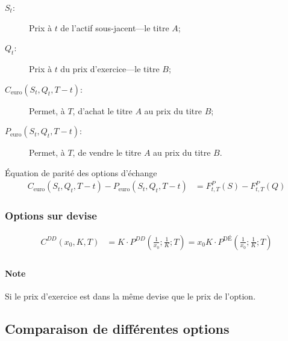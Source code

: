 \documentclass[10pt, french]{article}
\begin{document}
\begin{multicols*}{2}
\begin{rappel_enhanced}
\begin{description}
	\item[$S_{t}$:] Prix à $t$ de l'actif sous-jacent---le titre $A$;
	\item[$Q_{t}$:] Prix à $t$ du prix d'exercice---le titre $B$;
	\item[$C_{\text{euro}}(S_{t}, Q_{t}, T - t)$:] Permet, à $T$, d'achat le titre $A$ au prix du titre $B$;
	\item[$P_{\text{euro}}(S_{t}, Q_{t}, T - t)$:] Permet, à $T$, de vendre le titre $A$ au prix du titre $B$.
\end{description}
\end{rappel_enhanced}

\begin{rappel}{Équation de parité des options d'échange}
\begin{align*}
	C_{\text{euro}}(S_t, Q_t, T - t) - P_{\text{euro}}(S_t, Q_t, T-t) 
	&= 	F_{t,T}^{P}(S) - F_{t,T}^{P}(Q)
\end{align*}
\end{rappel}


\subsubsection*{Options sur devise}
\begin{align*}
	C^{DD}(x_0, K, T) 
	&= 	K \cdot P^{DD}\left( \frac{1}{x_0}; \frac{1}{K}; T \right) 
	= 	x_0	K \cdot P^{\text{DÉ}} \left( \frac{1}{x_0}; \frac{1}{K}; T \right) \\
\end{align*}

\paragraph{Note}	Si le prix d'exercice est dans la même devise que le prix de l'option.

\columnbreak
\subsection{Comparaison de différentes options}


\end{multicols*}
\end{document}
